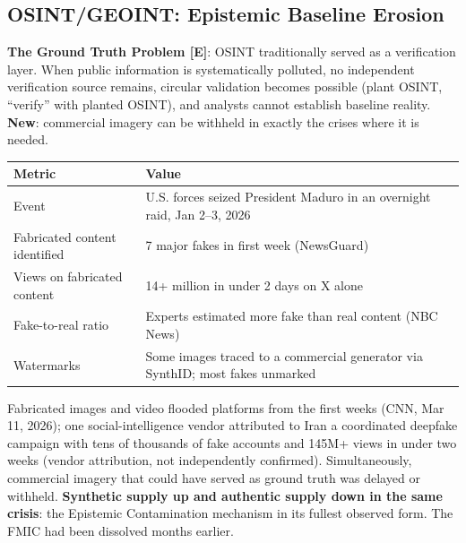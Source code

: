 \documentclass[11pt,letterpaper]{article}
\begin{document}
\subsection{OSINT/GEOINT: Epistemic Baseline Erosion}

\textbf{The Ground Truth Problem [E]}: OSINT traditionally served as a verification layer. When public information is systematically polluted, no independent verification source remains, circular validation becomes possible (plant OSINT, ``verify'' with planted OSINT), and analysts cannot establish baseline reality. \textbf{New}: commercial imagery can be withheld in exactly the crises where it is needed.

\begin{criticalbox}
\begin{center}
\small
\begin{tabularx}{\linewidth}{ZY{0.64}Y{1.36}}
\toprule
\textbf{Metric} & \textbf{Value} \\
\midrule
Event & U.S. forces seized President Maduro in an overnight raid, Jan 2--3, 2026 \\
Fabricated content identified & 7 major fakes in first week (NewsGuard) \\
Views on fabricated content & 14+ million in under 2 days on X alone \\
Fake-to-real ratio & Experts estimated more fake than real content (NBC News) \\
Watermarks & Some images traced to a commercial generator via SynthID; most fakes unmarked \\
\bottomrule
\end{tabularx}
\end{center}
\end{criticalbox}

\begin{criticalbox}
Fabricated images and video flooded platforms from the first weeks (CNN, Mar 11, 2026); one social-intelligence vendor attributed to Iran a coordinated deepfake campaign with tens of thousands of fake accounts and 145M+ views in under two weeks (vendor attribution, not independently confirmed). Simultaneously, commercial imagery that could have served as ground truth was delayed or withheld. \textbf{Synthetic supply up and authentic supply down in the same crisis}: the Epistemic Contamination mechanism in its fullest observed form. The FMIC had been dissolved months earlier.
\end{criticalbox}
\end{document}
